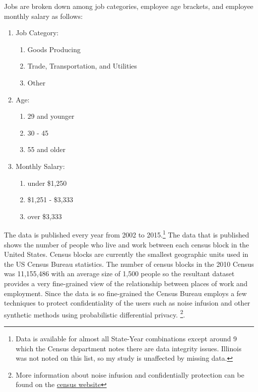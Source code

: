 \documentclass{article}
\theoremstyle{definition}
\theoremstyle{remark}
\newcommand\fnurl[2]{%
\href{#2}{#1}%
}
\begin{document}
Jobs are broken down among job categories, employee age brackets, and employee monthly salary as follows:
\begin{enumerate}
\item Job Category:
    \begin{enumerate}
        \item Goods Producing
        \item Trade, Transportation, and Utilities
        \item Other
    \end{enumerate}
\item Age:
    \begin{enumerate}
        \item 29 and younger
        \item 30 - 45
        \item 55 and older
    \end{enumerate}
\item Monthly Salary:
    \begin{enumerate}
        \item under \$1,250
        \item \$1,251 - \$3,333
        \item over \$3,333
    \end{enumerate}
\end{enumerate}

The data is published every year from 2002 to 2015.\footnote{Data is available for almost all State-Year combinations except around 9 which the Census department notes there are data integrity issues.  Illinois was not noted on this list, so my study is unaffected by missing data.}  The data that is published shows the number of people who live and work between each census block in the United States.  Census blocks are currently the smallest geographic units used in the US Census Bureau statistics.  The number of census blocks in the 2010 Census was 11,155,486 with an average size of 1,500 people so the resultant dataset provides a very fine-grained view of the relationship between places of work and employment.  Since the data is so fine-grained the Census Bureau employs a few techniques to protect confidentiality of the users such as noise infusion and other synthetic methods using probabilistic differential privacy. \footnote{More information about noise infusion and confidentially protection can be found on the \fnurl{census website}{https://www2.census.gov/ces/wp/2014/CES-WP-14-30.pdf}}.\\
\end{document}
